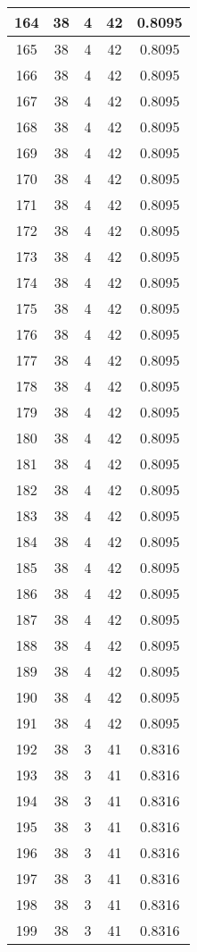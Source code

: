 \documentclass[letterpaper, 12pt]{article}
\begin{document}
\begin{longtable}{|c|c|c|c|c|}
\hline
164 & 38 & 4 & 42 & 0.8095 \\
\hline
165 & 38 & 4 & 42 & 0.8095 \\
\hline
166 & 38 & 4 & 42 & 0.8095 \\
\hline
167 & 38 & 4 & 42 & 0.8095 \\
\hline
168 & 38 & 4 & 42 & 0.8095 \\
\hline
169 & 38 & 4 & 42 & 0.8095 \\
\hline
170 & 38 & 4 & 42 & 0.8095 \\
\hline
171 & 38 & 4 & 42 & 0.8095 \\
\hline
172 & 38 & 4 & 42 & 0.8095 \\
\hline
173 & 38 & 4 & 42 & 0.8095 \\
\hline
174 & 38 & 4 & 42 & 0.8095 \\
\hline
175 & 38 & 4 & 42 & 0.8095 \\
\hline
176 & 38 & 4 & 42 & 0.8095 \\
\hline
177 & 38 & 4 & 42 & 0.8095 \\
\hline
178 & 38 & 4 & 42 & 0.8095 \\
\hline
179 & 38 & 4 & 42 & 0.8095 \\
\hline
180 & 38 & 4 & 42 & 0.8095 \\
\hline
181 & 38 & 4 & 42 & 0.8095 \\
\hline
182 & 38 & 4 & 42 & 0.8095 \\
\hline
183 & 38 & 4 & 42 & 0.8095 \\
\hline
184 & 38 & 4 & 42 & 0.8095 \\
\hline
185 & 38 & 4 & 42 & 0.8095 \\
\hline
186 & 38 & 4 & 42 & 0.8095 \\
\hline
187 & 38 & 4 & 42 & 0.8095 \\
\hline
188 & 38 & 4 & 42 & 0.8095 \\
\hline
189 & 38 & 4 & 42 & 0.8095 \\
\hline
190 & 38 & 4 & 42 & 0.8095 \\
\hline
191 & 38 & 4 & 42 & 0.8095 \\
\hline
192 & 38 & 3 & 41 & 0.8316 \\
\hline
193 & 38 & 3 & 41 & 0.8316 \\
\hline
194 & 38 & 3 & 41 & 0.8316 \\
\hline
195 & 38 & 3 & 41 & 0.8316 \\
\hline
196 & 38 & 3 & 41 & 0.8316 \\
\hline
197 & 38 & 3 & 41 & 0.8316 \\
\hline
198 & 38 & 3 & 41 & 0.8316 \\
\hline
199 & 38 & 3 & 41 & 0.8316 \\
\hline
\end{longtable}
\end{document}
